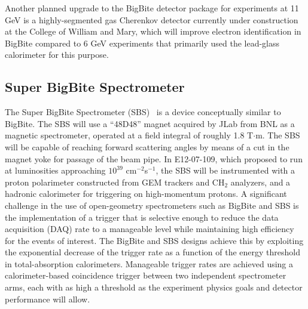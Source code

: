Another planned upgrade to the BigBite detector package for experiments at 11 GeV is a highly-segmented gas Cherenkov detector currently under construction at the College of William and Mary, which will improve electron identification in BigBite compared to 6 GeV experiments that primarily used the lead-glass calorimeter for this purpose.
\subsection{Super BigBite Spectrometer}

The Super BigBite Spectrometer (SBS)~\cite{SBS_CDR,SBS_CDR_NEW} is a device conceptually similar to BigBite. The SBS will use a ``48D48'' magnet acquired by JLab from BNL as a magnetic spectrometer, operated at a field integral of roughly 1.8 T$\cdot$m. The SBS will be capable of reaching forward scattering angles by means of a cut in the magnet yoke for passage of the beam pipe. In E12-07-109, which proposed to run at luminosities approaching $10^{39}$ cm$^{-2}$s$^{-1}$, the SBS will be instrumented with a proton polarimeter constructed from GEM trackers and CH$_2$ analyzers, and a hadronic calorimeter for triggering on high-momentum protons. %
A significant challenge in the use of open-geometry spectrometers such as BigBite and SBS is the implementation of a trigger that is selective enough to reduce the data acquisition (DAQ) rate to a manageable level while maintaining high efficiency for the events of interest. The BigBite and SBS designs achieve this by exploiting the exponential decrease of the trigger rate as a function of the energy threshold in total-absorption calorimeters. Manageable trigger rates are achieved using a calorimeter-based coincidence trigger between two independent spectrometer arms, each with as high a threshold as the experiment physics goals and detector performance will allow. %

